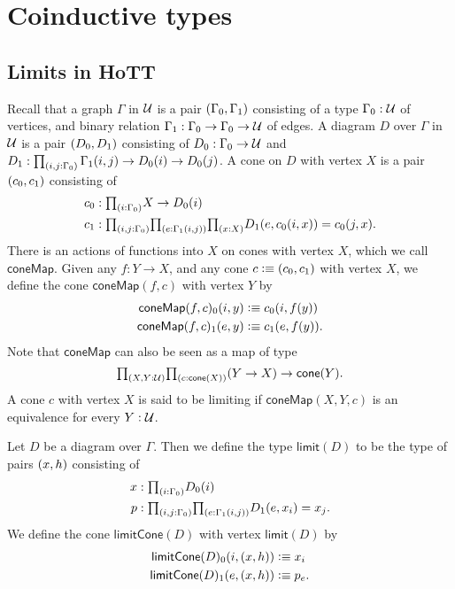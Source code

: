 \chapter{Coinductive types}

\section{Limits in HoTT}

Recall that a graph $\Gamma$ in $\mathcal{U}$ is a pair ${\mathopen{}(\Gamma_0,\Gamma_1)\mathclose{}}$ 
consisting of a type $\Gamma_0:\mathcal{U}$ of vertices, 
and binary relation $\Gamma_1:\Gamma_0\to\Gamma_0\to\mathcal{U}$ of edges. 
A diagram $D$ over $\Gamma$ in $\mathcal{U}$ is a pair ${\mathopen{}(D_0,D_1)\mathclose{}}$ consisting of
$D_0:\Gamma_0\to\mathcal{U}$ and $D_1:\prd{i,j:\Gamma_0}\Gamma_1(i,j)\to D_0(i)\to D_0(j)$. 
A cone on $D$ with vertex $X$ is a pair ${\mathopen{}(c_0,c_1)\mathclose{}}$ consisting of
\begin{align*}
c_0 & : \prd{i:\Gamma_0} X\to D_0(i) \\
c_1 & : \prd{i,j:\Gamma_0}{e:\Gamma_1(i,j)}{x:X} D_1(e,c_0(i,x))=c_0(j,x).
\end{align*}
There is an actions of functions into $X$ on cones with vertex $X$, which
we call $\mathsf{coneMap}$. 
Given any $f:Y\to X$, and any cone $c\vcentcolon\equiv {\mathopen{}(c_0,c_1)\mathclose{}}$ with vertex $X$,
we define the cone $\mathsf{coneMap}(f,c)$ with vertex $Y$ by
\begin{align*}
\mathsf{coneMap}(f,c)_0(i,y) & \vcentcolon\equiv c_0(i,f(y)) \\
\mathsf{coneMap}(f,c)_1(e,y) & \vcentcolon\equiv c_1(e,f(y)).
\end{align*}
Note that $\mathsf{coneMap}$ can also be seen as a map of type
\begin{equation*}
\prd{X,Y:\UU}{c:\mathsf{cone}(X)} (Y\to X)\to\mathsf{cone}(Y).
\end{equation*}
A cone $c$ with vertex $X$ is said to be limiting if $\mathsf{coneMap}(X,Y,c)$
is an equivalence for every $Y:\mathcal{U}$. 

\begin{defn}
Let $D$ be a diagram over $\Gamma$. Then we define the type $\mathsf{limit}(D)$
to be the type of pairs ${\mathopen{}(x,h)\mathclose{}}$ consisting of
\begin{align*}
x & : \prd{i:\Gamma_0}D_0(i) \\
p & : \prd{i,j:\Gamma_0}{e:\Gamma_1(i,j)}D_1(e,x_i)=x_j.
\end{align*}
We define the cone $\mathsf{limitCone}(D)$ with vertex $\mathsf{limit}(D)$ by
\begin{align*}
\mathsf{limitCone}(D)_0(i,{\mathopen{}(x,h)\mathclose{}}) & \vcentcolon\equiv x_i \\
\mathsf{limitCone}(D)_1(e,{\mathopen{}(x,h)\mathclose{}}) & \vcentcolon\equiv p_e.
\end{align*}
\end{defn}

